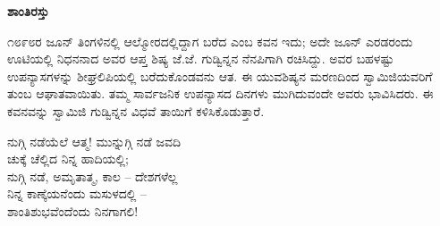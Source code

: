 \begin{myquote}
\end{myquote}

\begin{myquote}
\end{myquote}

\begin{myquote}
\end{myquote}

\selectkan

\begin{center}
\textbf{ಶಾಂತಿರಸ್ತು}
\end{center}

೧೮೯೮ರ ಜೂನ್ ತಿಂಗಳಿನಲ್ಲಿ ಆಲ್ಮೋರದಲ್ಲಿದ್ದಾಗ ಬರೆದ  ಎಂಬ ಕವನ ಇದು; ಅದೇ ಜೂನ್ ಎರಡರಂದು ಊಟಿಯಲ್ಲಿ ನಿಧನನಾದ ಅವರ ಆಪ್ತ ಶಿಷ್ಯ ಜೆ.ಜೆ. ಗುಡ್ವಿನ್ನನ ನೆನಪಿಗಾಗಿ ರಚಿಸಿದ್ದು. ಅವರ ಬಹಳಷ್ಟು ಉಪನ್ಯಾಸಗಳನ್ನು ಶೀಘ್ರಲಿಪಿಯಲ್ಲಿ ಬರೆದುಕೊಂಡವನು ಆತ. ಈ ಯುವಶಿಷ್ಯನ ಮರಣದಿಂದ ಸ್ವಾಮಿಜಿಯವರಿಗೆ ತುಂಬ ಆಘಾತವಾಯಿತು. ತಮ್ಮ ಸಾರ್ವಜನಿಕ ಉಪನ್ಯಾಸದ ದಿನಗಳು ಮುಗಿದುವಂದೇ ಅವರು ಭಾವಿಸಿದರು. ಈ ಕವನವನ್ನು ಸ್ವಾಮಿಜಿ ಗುಡ್ವಿನ್ನನ ವಿಧವೆ ತಾಯಿಗೆ ಕಳಿಸಿಕೊಡುತ್ತಾರೆ.

\begin{myquote}
ನುಗ್ಗಿ ನಡೆಯೆಲೆ ಆತ್ಮ! ಮುನ್ನುಗ್ಗಿ ನಡೆ ಜವದಿ\\ಚುಕ್ಕೆ ಚೆಲ್ಲಿದ ನಿನ್ನ ಹಾದಿಯಲ್ಲಿ;\\ನುಗ್ಗಿ ನಡೆ, ಅಮೃತಾತ್ಮ, ಕಾಲ – ದೇಶಗಳೆಲ್ಲ\\ನಿನ್ನ ಕಾಣ್ಕೆಯನೆಂದು ಮಸುಳದಲ್ಲಿ –\\ಶಾಂತಿಶುಭವೆಂದೆಂದು ನಿನಗಾಗಲಿ!
\end{myquote}

